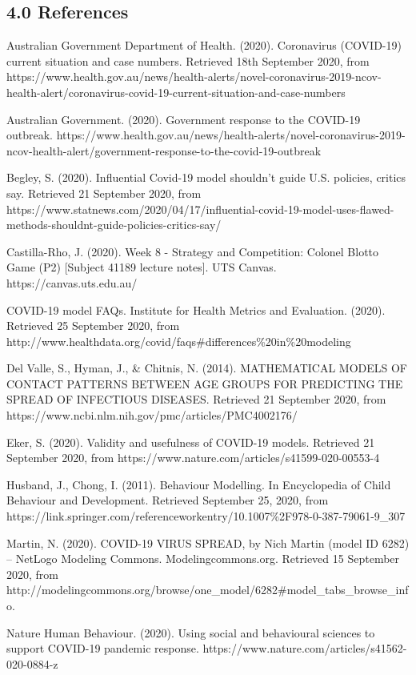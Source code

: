 \documentclass[11pt]{article}
\begin{document}
    \hypertarget{references}{%
\subsection{4.0 References}\label{references}}

    Australian Government Department of Health. (2020). Coronavirus
(COVID-19) current situation and case numbers. Retrieved 18th September
2020, from
https://www.health.gov.au/news/health-alerts/novel-coronavirus-2019-ncov-health-alert/coronavirus-covid-19-current-situation-and-case-numbers

Australian Government. (2020). Government response to the COVID-19
outbreak.
https://www.health.gov.au/news/health-alerts/novel-coronavirus-2019-ncov-health-alert/government-response-to-the-covid-19-outbreak

Begley, S. (2020). Influential Covid-19 model shouldn't guide U.S.
policies, critics say. Retrieved 21 September 2020, from
https://www.statnews.com/2020/04/17/influential-covid-19-model-uses-flawed-methods-shouldnt-guide-policies-critics-say/

Castilla-Rho, J. (2020). Week 8 - Strategy and Competition: Colonel
Blotto Game (P2) {[}Subject 41189 lecture notes{]}. UTS Canvas.
https://canvas.uts.edu.au/

COVID-19 model FAQs. Institute for Health Metrics and Evaluation.
(2020). Retrieved 25 September 2020, from
http://www.healthdata.org/covid/faqs\#differences\%20in\%20modeling

Del Valle, S., Hyman, J., \& Chitnis, N. (2014). MATHEMATICAL MODELS OF
CONTACT PATTERNS BETWEEN AGE GROUPS FOR PREDICTING THE SPREAD OF
INFECTIOUS DISEASES. Retrieved 21 September 2020, from
https://www.ncbi.nlm.nih.gov/pmc/articles/PMC4002176/

Eker, S. (2020). Validity and usefulness of COVID-19 models. Retrieved
21 September 2020, from
https://www.nature.com/articles/s41599-020-00553-4

Husband, J., Chong, I. (2011). Behaviour Modelling. In Encyclopedia of
Child Behaviour and Development. Retrieved September 25, 2020, from
https://link.springer.com/referenceworkentry/10.1007\%2F978-0-387-79061-9\_307

Martin, N. (2020). COVID-19 VIRUS SPREAD, by Nich Martin (model ID 6282)
-- NetLogo Modeling Commons. Modelingcommons.org. Retrieved 15 September
2020, from
http://modelingcommons.org/browse/one\_model/6282\#model\_tabs\_browse\_info.

Nature Human Behaviour. (2020). Using social and behavioural sciences to
support COVID-19 pandemic response.
https://www.nature.com/articles/s41562-020-0884-z
\end{document}
